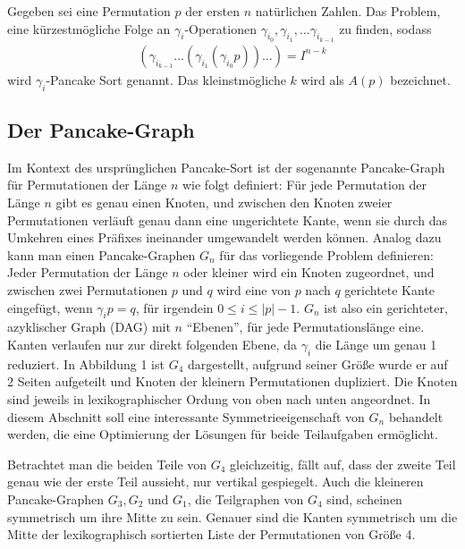 \documentclass[a4paper, 11pt, ngerman]{article}
\begin{document}
\begin{definition}
    Gegeben sei eine Permutation $p$ der ersten $n$ natürlichen Zahlen. Das Problem, eine kürzestmögliche Folge an $\gamma_i$-Operationen $\gamma_{i_0}, \gamma_{i_1}, \dots \gamma_{i_{k-1}}$ zu finden, sodass
    \begin{align*}
        (\gamma_{i_{k-1}} \dots (\gamma_{i_1} (\gamma_{i_0} p)) \dots) = I^{n - k}
    \end{align*}
    wird $\gamma_i$-Pancake Sort genannt. Das kleinstmögliche $k$ wird als $A(p)$ bezeichnet.
\end{definition}

\subsection{Der Pancake-Graph}

Im Kontext des ursprünglichen Pancake-Sort ist der sogenannte Pancake-Graph für Permutationen der Länge $n$ wie folgt definiert: Für jede Permutation der Länge $n$ gibt es genau einen Knoten, und zwischen den Knoten zweier Permutationen verläuft genau dann eine ungerichtete Kante, wenn sie durch das Umkehren eines Präfixes ineinander umgewandelt werden können. Analog dazu kann man einen Pancake-Graphen $G_n$ für das vorliegende Problem definieren: Jeder Permutation der Länge $n$ oder kleiner wird ein Knoten zugeordnet, und zwischen zwei Permutationen $p$ und $q$ wird eine von $p$ nach $q$ gerichtete Kante eingefügt, wenn $\gamma_i p = q$, für irgendein $0 \le i \le |p|-1$. $G_n$ ist also ein gerichteter, azyklischer Graph (DAG) mit $n$ ``Ebenen'', für jede Permutationslänge eine. Kanten verlaufen nur zur direkt folgenden Ebene, da $\gamma_i$ die Länge um genau 1 reduziert. In Abbildung 1 ist $G_4$ dargestellt, aufgrund seiner Größe wurde er auf 2 Seiten aufgeteilt und Knoten der kleinern Permutationen dupliziert. Die Knoten sind jeweils in lexikographischer Ordung von oben nach unten angeordnet. In diesem Abschnitt soll eine interessante Symmetrieeigenschaft von $G_n$ behandelt werden, die eine Optimierung der Lösungen für beide Teilaufgaben ermöglicht.

Betrachtet man die beiden Teile von $G_4$ gleichzeitig, fällt auf, dass der zweite Teil genau wie der erste Teil aussieht, nur vertikal gespiegelt. Auch die kleineren Pancake-Graphen $G_3, G_2$ und $G_1$, die Teilgraphen von $G_4$ sind, scheinen symmetrisch um ihre Mitte zu sein. Genauer sind die Kanten symmetrisch um die Mitte der lexikographisch sortierten Liste der Permutationen von Größe 4.
\end{document}
